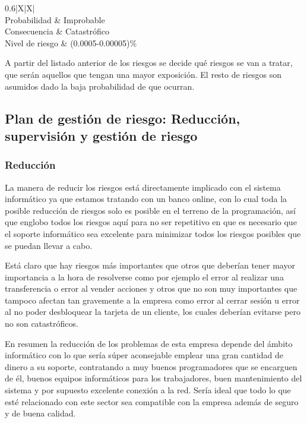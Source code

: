 \begin{table}[H]
	\centering
	\begin{tabularx}{0.6\textwidth}{|X|X|}
		\hline
		\\
		\hline
		Probabilidad    & Improbable         \\
		\hline
		Consecuencia    & Catastrófico       \\
		\hline
		Nivel de riesgo & (0.0005-0.00005)\% \\
		\hline
	\end{tabularx}
	\caption{Tabla de nivel de riesgo 14}
\end{table}

A partir del listado anterior de los riesgos se decide qué riesgos se van a tratar, que serán
aquellos que tengan una mayor exposición. El resto de riesgos son asumidos dado la baja
probabilidad de que ocurran.

\subsection{Plan de gestión de riesgo: Reducción, supervisión y gestión de riesgo}
\subsubsection{Reducción}

La manera de reducir los riesgos está directamente implicado con el sistema informático ya que estamos tratando con un banco online, con lo cual toda la posible reducción de riesgos solo es posible en el terreno de la programación, así que englobo todos los riesgos aquí para no ser repetitivo en que es necesario que el soporte informático sea excelente para minimizar todos los riesgos posibles que se puedan llevar a cabo.

Está claro que hay riesgos más importantes que otros que deberían tener mayor importancia a la hora de resolverse como por ejemplo el error al realizar una transferencia o error al vender acciones y otros que no son muy importantes que tampoco afectan tan gravemente a la empresa como error al cerrar sesión u error al no poder desbloquear la tarjeta de un cliente, los cuales deberían evitarse pero no son catastróficos.

En resumen la reducción de los problemas de esta empresa depende del ámbito informático con lo que sería súper aconsejable emplear una gran cantidad de dinero a su soporte, contratando a muy buenos programadores que se encarguen de él, buenos equipos informáticos para los trabajadores, buen mantenimiento del sistema y por supuesto excelente conexión a la red. Sería ideal que todo lo que esté relacionado con este sector sea compatible con la empresa además de seguro y de buena calidad.

